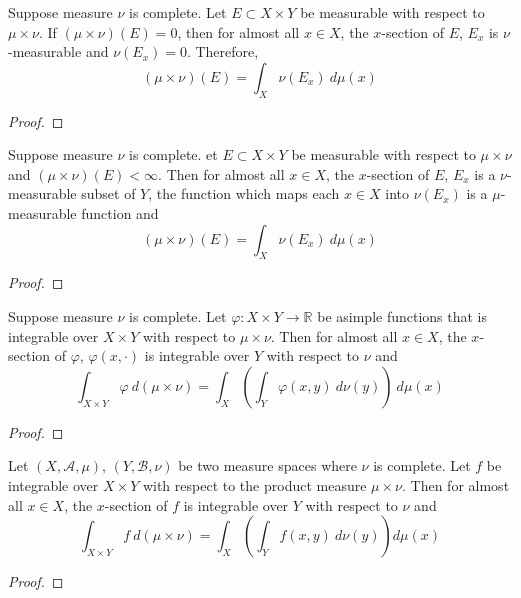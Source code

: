\begin{lemma}
	Suppose measure $\nu$ is complete.
	Let $E \subset X \times Y$ be measurable with respect to $\mu \times \nu$.
	If $(\mu \times \nu)(E) = 0$, then for almost all $x \in X$, the $x$-section of $E$, $E_x$ is $\nu$-measurable and $\nu(E_x) = 0$.
	Therefore,
	\begin{equation}
		(\mu \times \nu)(E) = \int_X \nu(E_x) \ d\mu(x)
	\end{equation}
\end{lemma}
\begin{proof}
\end{proof}

\begin{theorem}
	Suppose measure $\nu$ is complete.
	et $E \subset X \times Y$ be measurable with respect to $\mu \times \nu$ and $(\mu \times \nu)(E) < \infty$.
	Then for almost all $x \in X$, the $x$-section of $E$, $E_x$ is a $\nu$-measurable subset of $Y$, the function which maps each $x \in X$ into $\nu(E_x)$ is a $\mu$-measurable function and
	\begin{equation}
		(\mu \times \nu)(E) = \int_X \nu(E_x) \ d\mu(x)
	\end{equation}
\end{theorem}
\begin{proof}
\end{proof}

\begin{theorem}[Tonelli]
	Suppose measure $\nu$ is complete.
	Let $\varphi : X \times Y \to \mathbb{R}$ be asimple functions that is integrable over $X \times Y$ with respect to $\mu \times \nu$.
	Then for almost all $x \in X$, the $x$-section of $\varphi$, $\varphi(x,\cdot)$ is integrable over $Y$ with respect to $\nu$ and
	\begin{equation}
		\int_{X \times Y} \varphi \ d(\mu \times \nu) = \int_X \left( \int_Y  \varphi(x,y) \ d\nu(y) \right) \ d\mu(x)
	\end{equation}
\end{theorem}
\begin{proof}
\end{proof}

\begin{theorem}[Fubini]
	Let $(X,\mathcal{A},\mu)$, $(Y,\mathcal{B},\nu)$ be two measure spaces where $\nu$ is complete.
	Let $f$ be integrable over $X \times Y$ with respect to the product measure $\mu \times \nu$.
	Then for almost all $x \in X$, the $x$-section of $f$ is integrable over $Y$ with respect to $\nu$ and
	\begin{equation}
		\int_{X \times Y} f \ d(\mu \times \nu) = \int_X \left( \int_Y f(x,y) \ d\nu(y) \right) d\mu(x)
	\end{equation}
\end{theorem}
\begin{proof}
\end{proof}

